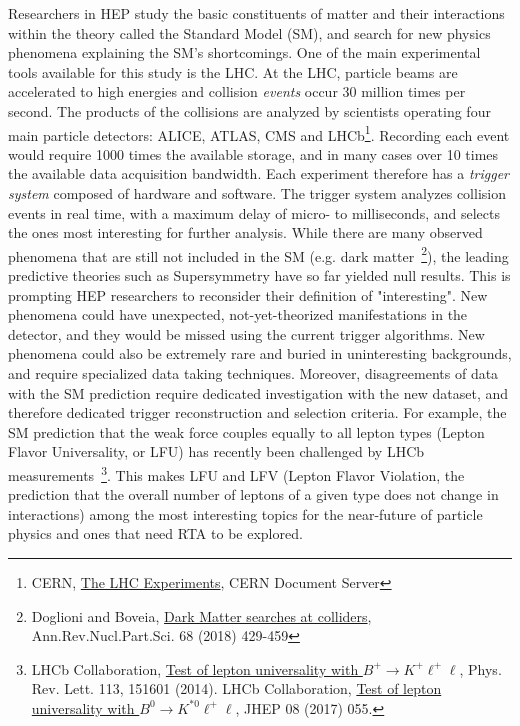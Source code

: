 Researchers in HEP study the basic constituents of matter and their interactions within the theory called the Standard Model (SM), and search for new physics phenomena explaining the SM's shortcomings. 
One of the main experimental tools available for this study is the LHC. 
At the LHC, particle beams are accelerated to high energies and 
collision \textit{events} occur 30 million times per second. 
The products of the collisions are analyzed by scientists operating four main particle detectors: ALICE, ATLAS, CMS and LHCb\footnote{CERN, \href{http://cds.cern.ch/record/1997374}{The LHC Experiments}, CERN Document Server}.
Recording each event would require 1000 times the available storage, and in many cases over 10 times the available data acquisition bandwidth.
Each experiment therefore has a \textit{trigger system} composed of hardware and software.
The trigger system analyzes collision events in real time, with a maximum delay of micro- to milliseconds, and selects the ones most interesting for further analysis. 
While there are many observed phenomena that are still not included in the SM (e.g. dark matter~\footnote{Doglioni and Boveia, \href{https://arxiv.org/abs/arXiv:1810.12238}{Dark Matter searches at colliders}, Ann.Rev.Nucl.Part.Sci. 68 (2018) 429-459}), the leading predictive theories such as Supersymmetry have so far yielded null results. 
This is prompting HEP researchers to reconsider their definition of "interesting". 
New phenomena could have unexpected, not-yet-theorized manifestations in the detector, and they would be missed using the current trigger algorithms. 
New phenomena could also be extremely rare and buried in uninteresting backgrounds, and require specialized data taking techniques. 
Moreover, disagreements of data with the SM prediction require dedicated investigation with the new dataset, and therefore dedicated trigger reconstruction and selection criteria. 
For example, the SM prediction that the weak force couples equally to all lepton types (Lepton Flavor Universality, or LFU) has recently been challenged by LHCb measurements~\footnote{LHCb Collaboration, \href{https://arxiv.org/abs/1705.05802}{Test of lepton universality with $ B^{+}\rightarrow K^{+}\ell^{+}\ell$}, Phys. Rev. Lett. 113, 151601 (2014). LHCb Collaboration, \href{https://arxiv.org/abs/1705.05802}{Test of lepton universality with $B^{0}\rightarrow K^{* 0}\ell^{+}\ell$}, JHEP 08 (2017) 055.}. This makes LFU and LFV (Lepton Flavor Violation, the prediction that the overall number of leptons of a given type does not change in interactions) among the most interesting topics for the near-future of particle physics and ones that need RTA to be explored. 

